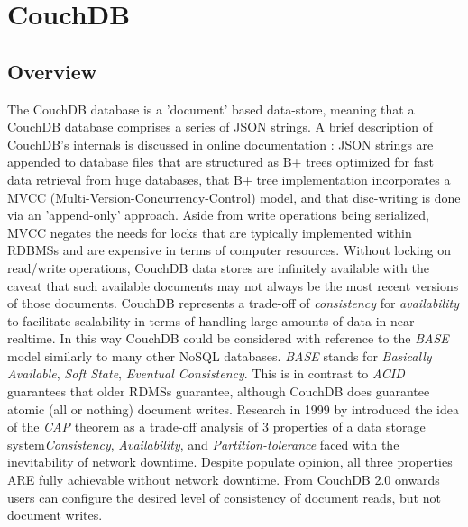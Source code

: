 \section{CouchDB}

\subsection{Overview}
The CouchDB database is a 'document' based data-store, meaning that a CouchDB database comprises a series of JSON strings. A brief description of CouchDB's internals is discussed in online documentation \cite{couchguide}: JSON strings are appended to database files that are structured as B+ trees optimized for fast data retrieval from huge databases, that B+ tree implementation incorporates a MVCC (Multi-Version-Concurrency-Control) model, and that disc-writing is done via an 'append-only' approach. Aside from write operations being serialized, MVCC negates the needs for locks that are typically implemented within RDBMSs and are expensive in terms of computer resources. Without locking on read/write operations, CouchDB data stores are infinitely available with the caveat that such available documents may not always be the most recent versions of those documents. CouchDB represents a trade-off of \textit{consistency} for \textit{availability} to facilitate scalability in terms of handling large amounts of data in near-realtime. In this way CouchDB could be considered with reference to the \textit{BASE} model similarly to many other NoSQL databases. \textit{BASE} stands for \textit{Basically Available}, \textit{Soft State}, \textit{Eventual Consistency}. This is in contrast to \textit{ACID} guarantees that older RDMSs guarantee, although CouchDB does guarantee atomic (all or nothing) document writes. Research in 1999 by \cite{cap} introduced the idea of the \textit{CAP} theorem as a trade-off analysis of 3 properties of a data storage system\textit{Consistency}, \textit{Availability}, and \textit{Partition-tolerance} faced with the inevitability of network downtime. Despite populate opinion, all three properties ARE fully achievable without network downtime. From CouchDB 2.0 onwards users can configure the desired level of consistency of document reads, but not document writes.


